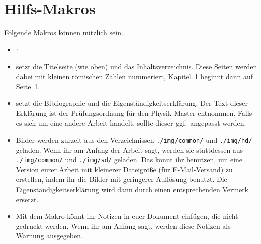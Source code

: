 \section{Hilfs-Makros}
Folgende Makros können nützlich sein.
\begin{itemize}
  \item \texttt{\string\wrap}: 
  
  \item \texttt{\string\makedocumentstart} setzt die Titelseite (wie oben) und das Inhaltsverzeichnis.
    Diese Seiten werden dabei mit kleinen römischen Zahlen nummeriert, Kapitel~1 beginnt dann auf Seite~1.
    
  \item \texttt{\string\makedocumentend} setzt die Bibliographie und die Eigenständigkeitserklärung.
    Der Text dieser Erklärung ist der Prüfungsordnung für den Physik-Master entnommen.
    Falls es sich um eine andere Arbeit handelt, sollte dieser ggf.~angepasst werden.
    
  \item Bilder werden zurzeit aus den Verzeichnissen \texttt{./img/common/} und \texttt{./img/hd/} geladen.
    Wenn ihr am Anfang der Arbeit \texttt{\string\reducesizetrue} sagt, werden sie stattdessen aus \texttt{./img/common/} und \texttt{./img/sd/} geladen.
    Das könnt ihr benutzen, um eine Version eurer Arbeit mit kleinerer Dateigröße (für E-Mail-Versand) zu erstellen, indem ihr die Bilder mit geringerer Auflösung benutzt.
    Die Eigenständigkeitserklärung wird dann durch einen entsprechenden Vermerk ersetzt.
    
  \item Mit dem Makro \texttt{\string\todo} könnt ihr Notizen in euer Dokument einfügen, die nicht gedruckt werden.
    Wenn ihr am Anfang \texttt{\string\showtodostrue} sagt, werden diese Notizen als Warnung ausgegeben.
\end{itemize}

